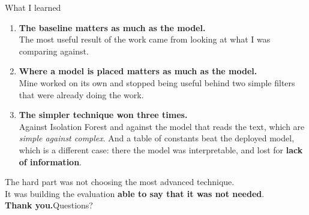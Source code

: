 \documentclass[aspectratio=169]{beamer}
\begin{document}
\begin{frame}[plain]{What I learned}
\begin{enumerate}
  \item \textbf{The baseline matters as much as the model.}\\
        \footnotesize The most useful result of the work came from looking at what I was
        comparing against.\\[2mm]
  \item \textbf{Where a model is placed matters as much as the model.}\\
        \footnotesize Mine worked on its own and stopped being useful behind two simple filters
        that were already doing the work.\\[2mm]
  \item \textbf{The simpler technique won three times.}\\
        \footnotesize Against Isolation Forest and against the model that reads the text, which are
        \emph{simple against complex}. And a table of constants beat the deployed model, which
        is a different case: there the model was interpretable, and lost for \textbf{lack of
        information}.
\end{enumerate}
\vspace{4mm}
\begin{center}
\small The hard part was not choosing the most advanced technique.\\
It was building the evaluation \textbf{able to say that it was not needed}.\\[6mm]
{\Large \textbf{Thank you.}\quad Questions?}
\end{center}
\end{frame}
\end{document}
